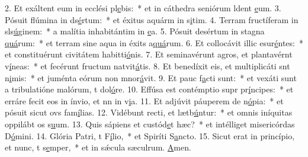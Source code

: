2. Et exáltent eum in ecclési pl\uline{e}bis:~* et in cáthedra seniórum ldent \uline{e}um.
3. Pósuit flúmina in ds\uline{é}rtum:~* et éxitus aquárm in s\uline{i}tim.
4. Terram fructíferam in sls\uline{ú}ginem:~* a malítia inhabitántim in \uline{e}a.
5. Pósuit desértum in stagna \uline{quá}rum:~* et terram sine aqua in éxits a\uline{quá}rum.
6. Et collocávit illic esur\uline{é}ntes:~* et constituérunt civitátem habitti\uline{ó}nis.
7. Et seminavérunt agros, et plantavérnt v\uline{í}neas:~* et fecérunt fructum natvit\uline{á}tis.
8. Et benedíxit eis, et multiplicáti snt n\uline{i}mis:~* et juménta eórum non mnor\uline{á}vit.
9. Et pauc f\uline{a}cti sunt:~* et vexáti sunt a tribulatióne malórum, t dol\uline{ó}re.
10. Effúsa est contémptio supr pr\uline{í}ncipes:~* et erráre fecit eos in ínvio, et nn in v\uline{i}a.
11. Et adjúvit páuperem de n\uline{ó}pia:~* et pósuit sicut ovs fam\uline{í}lias.
12. Vidébunt recti, et lætb\uline{ú}ntur:~* et omnis iníquitas oppilábt os s\uline{u}um.
13. Quis sápiens et custód\uline{e}t hæc?~* et intélliget misericórdas D\uline{ó}mini.
14. Glória Patri, t F\uline{í}lio,~* et Spiríti S\uline{a}ncto.
15. Sicut erat in princípio, et nunc, t s\uline{e}mper,~* et in sǽcula sæculrum. \uline{A}men.
